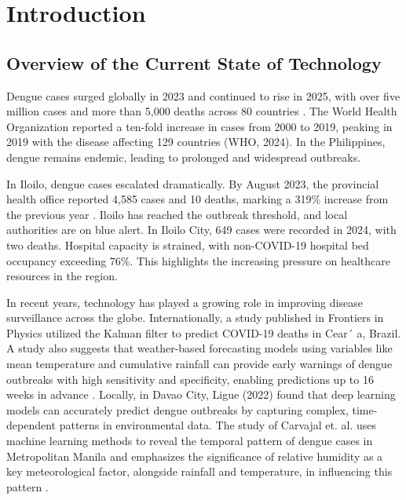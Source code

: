 \chapter{Introduction}
\label{sec:researchdesc}    %

\section{Overview of the Current State of Technology}
\label{sec:overview}

Dengue cases surged globally in 2023 and continued to rise in 2025, with over five million cases and more than 5,000 deaths across 80 countries \cite{bosano2023who}. The World Health Organization reported a ten-fold increase in cases from 2000 to 2019, peaking in 2019 with the disease affecting 129 countries (WHO, 2024). In the Philippines, dengue remains endemic, leading to prolonged and widespread outbreaks.

In Iloilo, dengue cases escalated dramatically. By August 2023, the provincial health office reported 4,585 cases and 10 deaths, marking a 319\% increase from the previous year \cite{lena2024}. Iloilo has reached the outbreak threshold, and local authorities are on blue alert. In Iloilo City, 649 cases were recorded in 2024, with two deaths. Hospital capacity is strained, with non-COVID-19 hospital bed occupancy exceeding 76\%. This highlights the increasing pressure on healthcare resources in the region.

In recent years, technology has played a growing role in improving disease surveillance across the globe. Internationally, a study published in Frontiers in Physics utilized the Kalman filter to predict COVID-19 deaths in Cear´ a, Brazil\cite{ahmadini2021analysis}. A study also suggests
that weather-based forecasting models using variables like mean temperature and cumulative rainfall can provide early warnings of dengue outbreaks with high sensitivity and specificity, enabling predictions up to 16 weeks in advance \cite{hii2012forecast}. Locally, in Davao City, Ligue (2022) found that deep learning models can accurately predict dengue outbreaks by capturing complex, time-dependent patterns in environmental data. The study of Carvajal et. al. uses machine learning methods to reveal the temporal pattern of dengue cases in Metropolitan Manila and emphasizes the significance of relative humidity as a key meteorological factor, alongside rainfall and temperature, in influencing this pattern \cite{carvajal2018machine}.

